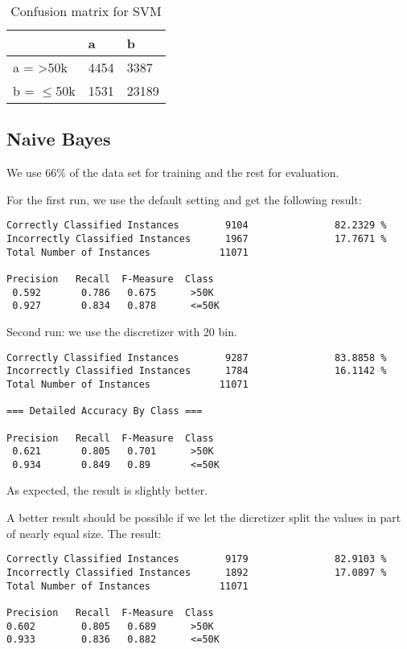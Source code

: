 \documentclass[paper=a4, fontsize=11pt]{scrartcl} %
\numberwithin{equation}{section} %
\numberwithin{figure}{section} %
\numberwithin{table}{section} %
\begin{document}
\vspace{6pt}

\begin{table}[h]
\centering
\begin{tabular}{|l|ll|}
\hline
              &    a &     b \\
\hline
 a = >50k      & 4454 &  3387 \\
 b = $\leq$50k & 1531 & 23189\\
\hline
\end{tabular}
\caption{Confusion matrix for SVM}
\end{table}


\subsection{Naive Bayes}

We use 66\% of the data set for training and the rest for evaluation.

For the first run, we use the default setting and get the following result:

\begin{verbatim}
Correctly Classified Instances        9104               82.2329 %
Incorrectly Classified Instances      1967               17.7671 %
Total Number of Instances            11071     

Precision   Recall  F-Measure  Class
 0.592       0.786   0.675      >50K
 0.927       0.834   0.878      <=50K
\end{verbatim}

Second run: we use the discretizer with 20 bin.

\begin{verbatim}
Correctly Classified Instances        9287               83.8858 %
Incorrectly Classified Instances      1784               16.1142 %
Total Number of Instances            11071     

=== Detailed Accuracy By Class ===

Precision   Recall  F-Measure  Class
 0.621       0.805   0.701      >50K
 0.934       0.849   0.89       <=50K
\end{verbatim}

As expected, the result is slightly better.

A better result should be possible if we let the dicretizer split the values in part of nearly equal size. The result:

\begin{verbatim}
Correctly Classified Instances        9179               82.9103 %
Incorrectly Classified Instances      1892               17.0897 %
Total Number of Instances            11071     

Precision   Recall  F-Measure  Class
0.602        0.805   0.689      >50K
0.933        0.836   0.882      <=50K
\end{verbatim}
\end{document}
